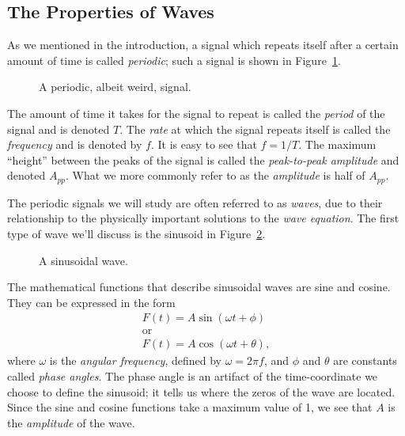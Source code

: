 \subsection{The Properties of Waves}
\label{sec:SCOPE:waveprop}
As we mentioned in the introduction, a signal which repeats itself after a 
certain amount of time is called {\it periodic}; such a signal is shown in 
Figure~\ref{fig:scope:periodic}.
\begin{figure}[htb]
\centerline{\epsfxsize=12cm }
\caption{A periodic, albeit weird, signal.}
\label{fig:scope:periodic}
\end{figure}
The amount of time it takes for the signal to repeat is called the {\it period}
of the signal and is denoted $T$.  The {\it rate} at which 
the signal repeats itself is called the {\it frequency} and is denoted by $f$. 
It is easy to see that $f=1/T$.  The maximum ``height'' between the peaks of
the signal is called the {\it peak-to-peak amplitude} and denoted $A_{pp}$.
What we more commonly refer to as the {\it amplitude} is half of $A_{pp}$.  

The periodic signals we will study are often referred to as {\it waves}, due to
their relationship to the physically important solutions to the {\it wave
equation}.  The first type of wave we'll discuss is the sinusoid in 
Figure~\ref{fig:scope:sinusoid}.
\begin{figure}
\centerline{\epsfxsize=8cm }
\caption{A sinusoidal wave.}
\label{fig:scope:sinusoid}
\end{figure}
The mathematical functions that describe sinusoidal waves are sine and cosine.
They can be expressed in the form
\begin{eqnarray*}
& F(t) = A \sin(\omega t+\phi) & \\ 
& \mbox{or} & \\
& F(t) = A \cos(\omega t+\theta), &  
\end{eqnarray*}
where $\omega$ is the {\it angular frequency}, defined by $\omega=2\pi f$, and
$\phi$ and $\theta$ are constants called {\it phase angles}.  The phase angle
is an artifact of the time-coordinate we choose to define the sinusoid; it
tells us where the zeros of the wave are located.  Since the sine and cosine
functions take a maximum value of 1, we see that $A$ is the {\it amplitude} of 
the wave.

